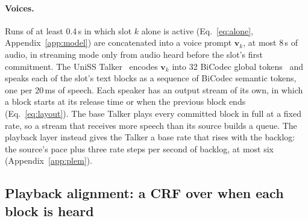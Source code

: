 \paragraph{Voices.} Runs of at least 0.4\,s in which slot $k$ alone is active (Eq.~\eqref{eq:alone},
Appendix~\ref{app:model}) are concatenated into a voice prompt $\bm{v}_k$, at most 8\,s of audio, in streaming mode only
from audio heard before the slot's first commitment. The UniSS Talker~\citep{uniss2025} encodes $\bm{v}_k$ into 32
BiCodec global tokens~\citep{wang2025spark} and speaks each of the slot's text blocks as a sequence of BiCodec semantic
tokens, one per 20\,ms of speech. Each speaker has an output stream of its own, in which a block starts at its release
time or when the previous block ends (Eq.~\eqref{eq:layout}). The base Talker plays every committed block in full at a
fixed rate, so a stream that receives more speech than its source builds a queue. The playback layer instead gives the
Talker a base rate that rises with the backlog: the source's pace plus three rate steps per second of backlog, at most
six (Appendix~\ref{app:plem}).

\subsection{Playback alignment: a CRF over when each block is heard}
\label{sec:method-plem}

